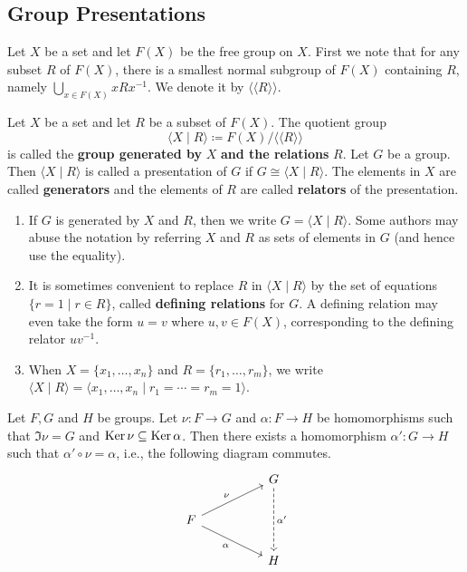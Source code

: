 \subsection{Group Presentations} \label{sec-group-presentations}
Let $X$ be a set and let $F(X)$ be the free group on $X$. First we note that for any subset $R$ of $F(X)$, there is a smallest normal subgroup of $F(X)$ containing $R$, namely $\bigcup_{x\in F(X)} xRx^{-1}$. We denote it by $\langle\langle R\rangle\rangle$.
\begin{definition}
	Let $X$ be a set and let $R$ be a subset of $F(X)$. The quotient group $$\langle X\mid R\rangle\coloneq F(X)/\langle\langle R\rangle\rangle$$ is called the \textbf{group generated by} $X$ \textbf{and the relations} $R$.  Let $G$ be a group. Then $\langle X\mid R\rangle$ is called a presentation of $G$ if $G\cong\langle X\mid R\rangle$. The elements in $X$ are called \textbf{generators} and the elements of $R$ are called \textbf{relators} of the presentation.
\end{definition} 
\begin{remark}
	\begin{enumerate}[(1)]
		\item If $G$ is generated by $X$ and $R$, then we write $G = \langle X\mid R\rangle$. Some authors may abuse the notation by referring $X$ and $R$ as sets of elements in $G$ (and hence use the equality).
		\item It is sometimes convenient to replace $R$ in $\langle X\mid R\rangle$ by the set of equations $\{r=1\mid r\in R\}$, called \textbf{defining relations} for $G$. A defining relation may even take the form
		$u=v$ where $u,v\in F(X)$, corresponding to the defining relator $uv^{-1}$.
		\item When $X=\{x_1,\dots, x_n\}$ and $R = \{r_1,\dots, r_m\}$, we write $\langle X\mid R\rangle = \langle x_1,\dots, x_n \mid r_1=\cdots = r_m=1 \rangle$.
	\end{enumerate}
\end{remark}
\begin{lemma} \label{lemma-for-von-Dyck}
	Let $F,G$ and $H$ be groups. Let $\nu :F\to G$ and $\alpha:F\to H$ be homomorphisms such that $\Im \nu = G$ and $\operatorname{Ker} \nu \subseteq \operatorname{Ker} \alpha$. Then there exists a homomorphism $\alpha':G\to H$ such that $ \alpha'\circ \nu = \alpha$, i.e., the following diagram commutes.
	\[\begin{tikzcd}
		&& G \\
		F \\
		&& H
		\arrow["{\alpha'}", dashed, from=1-3, to=3-3]
		\arrow["\nu", from=2-1, to=1-3]
		\arrow["\alpha"', from=2-1, to=3-3]
	\end{tikzcd}\]
\end{lemma}

